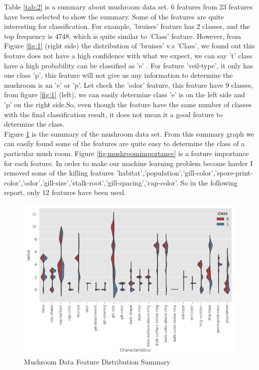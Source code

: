 \documentclass[10pt, conference, compsocconf]{IEEEtran}
\begin{document}
Table \ref{tab:2} is a summary about mushroom data set. 6 features from 23 features have been selected to show the summary. Some of the features are quite interesting for classification. For example, 'bruises' feature has 2 classes, and the top frequency is 4748, which is quite similar to 'Class' feature. However, from Figure \ref{fig:1} (right side) the distribution of 'bruises' v.s 'Class', we found out this feature does not have a high confidence with what we expect, we can say 't' class have a high probability can be classified as 'e' . For feature 'veil-type', it only has one class 'p', this feature will not give us any information to determine the mushroom is an 'e' or 'p'. Let check the 'odor' feature, this feature have 9 classes, from figure \ref{fig:1} (left), we can easily determine class 'e' is on the left side and 'p' on the right side.So, even though the feature have the same number of classes with the final classification result, it does not mean it a good feature to determine the class.\\
Figure \ref{fig:mushroomSummary} is the summary of the mushroom data set. From this summary graph we can easily found some of the features are quite easy to determine the class of a particular mush room. Figure \ref{fig:mushroomimportance} is a feature importance for each feature. In order to make our machine learning problem become harder I removed some of the killing features {'habitat','population','gill-color','spore-print-color','odor','gill-size','stalk-root','gill-spacing','cap-color'}. So in the following report, only 12 features have been used. 
\begin{figure}[h]
	\includegraphics[scale = 0.4]{image/mushroomSummary.png}
	\caption{Mushroom Data Feature Distribution Summary}
	\label{fig:mushroomSummary}
\end{figure}
\end{document}
